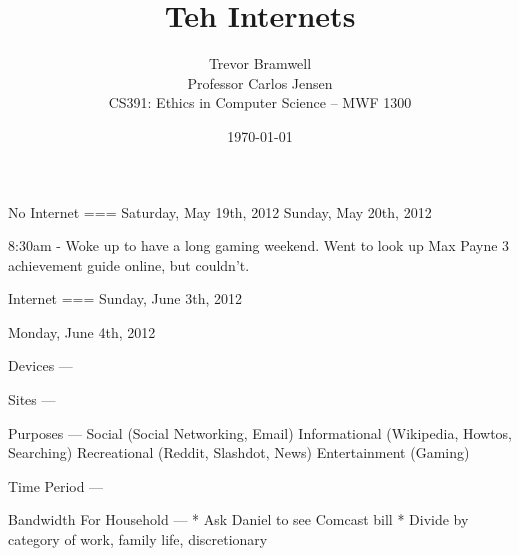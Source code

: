 \documentclass[12pt,letterpaper]{article}
\title{Teh Internets}
\author{
    Trevor Bramwell\\
    Professor Carlos Jensen\\
    CS391: Ethics in Computer Science -- MWF 1300\\
}
\date{\today}
\begin{document}
\maketitle




No Internet
===
Saturday, May 19th, 2012
Sunday, May 20th, 2012

8:30am - Woke up to have a long gaming weekend. Went to look up Max
Payne 3 achievement guide online, but couldn't.







Internet
===
Sunday, June 3th, 2012

Monday, June 4th, 2012


Devices
---

Sites
---

Purposes
---
Social (Social Networking, Email)
Informational (Wikipedia, Howtos, Searching)
Recreational (Reddit, Slashdot, News)
Entertainment (Gaming)

Time Period
---

Bandwidth For Household
---
 * Ask Daniel to see Comcast bill
 * Divide by category of work, family life, discretionary
\end{document}
